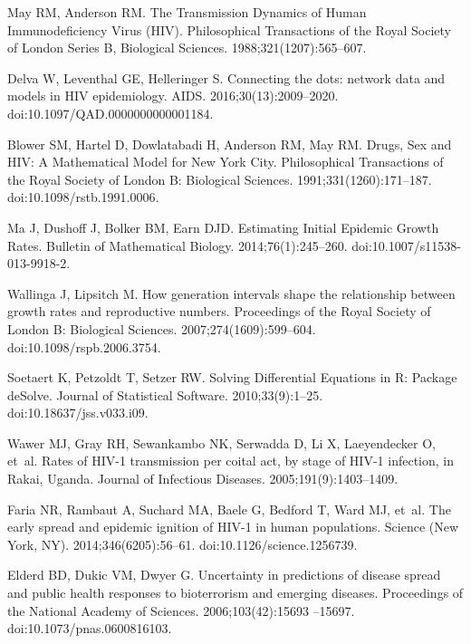 \documentclass[10pt,letterpaper]{article}
\begin{document}
\begin{thebibliography}{10}
May RM, Anderson RM.
\newblock The Transmission Dynamics of Human Immunodeficiency Virus (HIV).
\newblock Philosophical Transactions of the Royal Society of London Series B,
  Biological Sciences. 1988;321(1207):565--607.

Delva W, Leventhal GE, Helleringer S.
\newblock Connecting the dots: network data and models in {HIV} epidemiology.
\newblock AIDS. 2016;30(13):2009--2020.
\newblock doi:{10.1097/QAD.0000000000001184}.

Blower SM, Hartel D, Dowlatabadi H, Anderson RM, May RM.
\newblock Drugs, Sex and {HIV}: A Mathematical Model for {New York City}.
\newblock Philosophical Transactions of the Royal Society of London B:
  Biological Sciences. 1991;331(1260):171--187.
\newblock doi:{10.1098/rstb.1991.0006}.

Ma J, Dushoff J, Bolker BM, Earn DJD.
\newblock Estimating Initial Epidemic Growth Rates.
\newblock Bulletin of Mathematical Biology. 2014;76(1):245--260.
\newblock doi:{10.1007/s11538-013-9918-2}.

Wallinga J, Lipsitch M.
\newblock How generation intervals shape the relationship between growth rates
  and reproductive numbers.
\newblock Proceedings of the Royal Society of London B: Biological Sciences.
  2007;274(1609):599--604.
\newblock doi:{10.1098/rspb.2006.3754}.

Soetaert K, Petzoldt T, Setzer RW.
\newblock Solving Differential Equations in {R}: Package {deSolve}.
\newblock Journal of Statistical Software. 2010;33(9):1--25.
\newblock doi:{10.18637/jss.v033.i09}.

Wawer MJ, Gray RH, Sewankambo NK, Serwadda D, Li X, Laeyendecker O, et~al.
\newblock Rates of {HIV}-1 transmission per coital act, by stage of {HIV}-1
  infection, in {Rakai}, {Uganda}.
\newblock Journal of Infectious Diseases. 2005;191(9):1403--1409.

Faria NR, Rambaut A, Suchard MA, Baele G, Bedford T, Ward MJ, et~al.
\newblock The early spread and epidemic ignition of {HIV}-1 in human
  populations.
\newblock Science (New York, NY). 2014;346(6205):56--61.
\newblock doi:{10.1126/science.1256739}.

Elderd BD, Dukic VM, Dwyer G.
\newblock Uncertainty in predictions of disease spread and public health
  responses to bioterrorism and emerging diseases.
\newblock Proceedings of the National Academy of Sciences. 2006;103(42):15693
  --15697.
\newblock doi:{10.1073/pnas.0600816103}.


\end{thebibliography}
\end{document}
